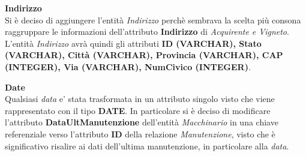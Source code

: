 \textbf{\large{Indirizzo}}\\
Si è deciso di aggiungere l'entità \emph{Indirizzo} perchè sembrava la scelta più consona raggruppare le informazioni dell'attributo \textbf{Indirizzo} di \emph{Acquirente e Vigneto}. L'entità \emph{Indirizzo} avrà quindi gli attributi \textbf{ID (VARCHAR), Stato (VARCHAR), Città (VARCHAR), Provincia (VARCHAR), CAP (INTEGER), Via (VARCHAR), NumCivico (INTEGER)}.

\begin{flushleft}
\textbf{\large{Date}}\\
Qualsiasi \emph{data} e' stata trasformata in un attributo singolo visto che viene rappresentato con il tipo \textbf{DATE}. In particolare si è deciso di modificare l'attributo \textbf{DataUltManutenzione} dell'entità \emph{Macchinario} in una chiave referenziale verso l'attributo \textbf{ID} della relazione \emph{Manutenzione}, visto che è significativo risalire ai dati dell'ultima manutenzione, in particolare alla \emph{data}. 
\end{flushleft}
